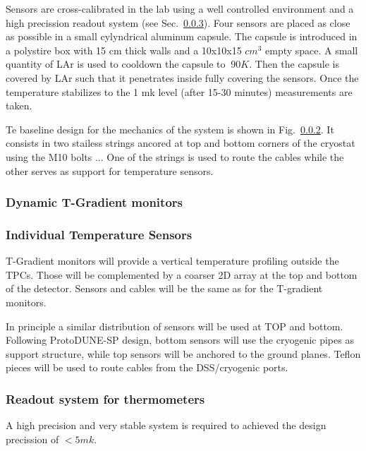 Sensors are cross-calibrated in the lab using a well controlled environment and a high precission readout system (see Sec.~\ref{sec:fdsp-slow-cryo-therm-readout}).
Four sensors are placed as close as possible in a small cylyndrical aluminum capsule. The capsule is introduced in a polystire box with 15 cm thick walls
and a 10x10x15 $cm^3$ empty space. A small quantity of LAr is used to cooldown the capsule to $~90 K$. Then the capsule is covered by LAr such that it penetrates
inside fully covering the sensors. Once the temperature stabilizes to the 1 mk level (after 15-30 minutes) measurements are taken. 

Te baseline design for the mechanics of the system is shown in Fig.~\ref{}. It consists in two stailess strings ancored at top and bottom corners of the cryostat
using the M10 bolts ... One of the strings is used to route the cables while the other serves as support for temperature sensors. 


\subsubsection{Dynamic T-Gradient monitors}

\subsubsection{Individual Temperature Sensors}

T-Gradient monitors will provide a vertical temperature profiling outside the TPCs. Those will be complemented by a coarser 2D array at the top and bottom of the
detector. Sensors and cables will be the same as for the T-gradient monitors.

In principle a similar distribution of sensors will be used at TOP and bottom.
Following ProtoDUNE-SP design, bottom sensors will use the cryogenic pipes as support structure, while top sensors will be anchored to the ground planes.
Teflon pieces will be used to route cables from the DSS/cryogenic ports. 


\subsubsection{Readout system for thermometers}
\label{sec:fdsp-slow-cryo-therm-readout}

A high precision and very stable system is required to achieved the design precission of $< 5 mk$.


